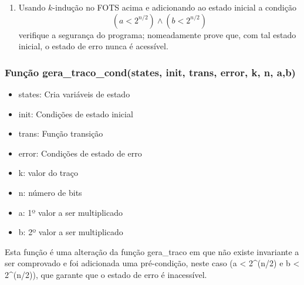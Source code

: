 \documentclass[11pt]{article}
\providecommand{\tightlist}{%
      \setlength{\itemsep}{0pt}\setlength{\parskip}{0pt}}
\begin{document}
    \begin{enumerate}
\def\labelenumi{\alph{enumi}.}
\setcounter{enumi}{2}
\tightlist
\item
  Usando \(k\)-indução no FOTS acima e adicionando ao estado inicial a
  condição \[\,\] \[\,(a < 2^{n/2})\land(b < 2^{n/2})\,\] \[\,\]
  verifique a segurança do programa; nomeadamente prove que, com tal
  estado inicial, o estado de erro nunca é acessível.
\end{enumerate}

\hypertarget{funuxe7uxe3o-gera_traco_condstates-init-trans-error-k-n-ab}{%
\subsubsection{Função gera\_traco\_cond(states, init, trans, error, k,
n,
a,b)}\label{funuxe7uxe3o-gera_traco_condstates-init-trans-error-k-n-ab}}

\begin{itemize}
\tightlist
\item
  states: Cria variáveis de estado
\item
  init: Condições de estado inicial
\item
  trans: Função transição
\item
  error: Condições de estado de erro
\item
  k: valor do traço
\item
  n: número de bits
\item
  a: 1º valor a ser multiplicado
\item
  b: 2º valor a ser multiplicado
\end{itemize}

Esta função é uma alteração da função gera\_traco em que não existe
invariante a ser comprovado e foi adicionada uma pré-condição, neste
caso (a \textless{} 2\^{}(n/2) e b \textless{} 2\^{}(n/2)), que garante
que o estado de erro é inacessível.
\end{document}
